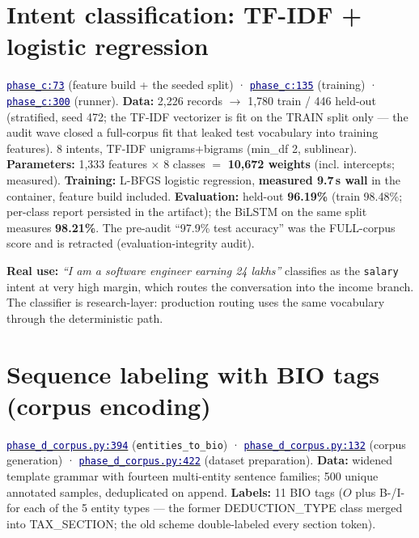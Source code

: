 \documentclass[11pt,a4paper]{article}
\newcommand{\code}[2]{\href{https://github.com/Jayant1711/Tax_Assist-system/blob/v0.7-sprint7/#1}{\texttt{\textcolor{navy}{#2}}}}
\newcommand{\facts}[1]{{\small\textcolor{muted}{#1}\par}}
\begin{document}
\section{Intent classification: TF-IDF + logistic regression}
\facts{\code{nlp\_research/phase\_c\_intent\_classification.py}{phase\_c:73}
(feature build + the seeded split) · \code{nlp\_research/phase\_c\_intent\_classification.py}{phase\_c:135}
(training) · \code{nlp\_research/phase\_c\_intent\_classification.py}{phase\_c:300}
(runner). \textbf{Data:} 2,226 records $\rightarrow$ 1,780 train / 446 held-out
(stratified, seed 472; the TF-IDF vectorizer is fit on the TRAIN split only
--- the audit wave closed a full-corpus fit that leaked test vocabulary into
training features). 8 intents, TF-IDF unigrams+bigrams (min\_df 2, sublinear).
\textbf{Parameters:} 1,333 features $\times$ 8 classes $=$ \textbf{10,672
weights} (incl. intercepts; measured). \textbf{Training:} L-BFGS logistic
regression, \textbf{measured 9.7\,s wall} in the container, feature build
included. \textbf{Evaluation:} held-out \textbf{96.19\%} (train 98.48\%;
per-class report persisted in the artifact); the BiLSTM on the same split
measures \textbf{98.21\%}. The pre-audit ``97.9\% test accuracy'' was the
FULL-corpus score and is retracted (evaluation-integrity audit).}

\begin{examplebox}
\textbf{Real use:} \emph{``I am a software engineer earning 24 lakhs''} classifies
as the \texttt{salary} intent at very high margin, which routes the conversation
into the income branch. The classifier is research-layer: production routing
uses the same vocabulary through the deterministic path.
\end{examplebox}

\section{Sequence labeling with BIO tags (corpus encoding)}
\facts{\code{nlp\_research/phase\_d\_corpus.py}{phase\_d\_corpus.py:394}
(\texttt{entities\_to\_bio}) · \code{nlp\_research/phase\_d\_corpus.py}{phase\_d\_corpus.py:132}
(corpus generation) · \code{nlp\_research/phase\_d\_corpus.py}{phase\_d\_corpus.py:422}
(dataset preparation). \textbf{Data:} widened template grammar with fourteen
multi-entity sentence families; 500 unique annotated samples, deduplicated on
append. \textbf{Labels:} 11
BIO tags ($O$ plus B-/I- for each of the 5 entity types --- the former
DEDUCTION\_TYPE class merged into TAX\_SECTION; the old scheme double-labeled
every section token).}
\end{document}
